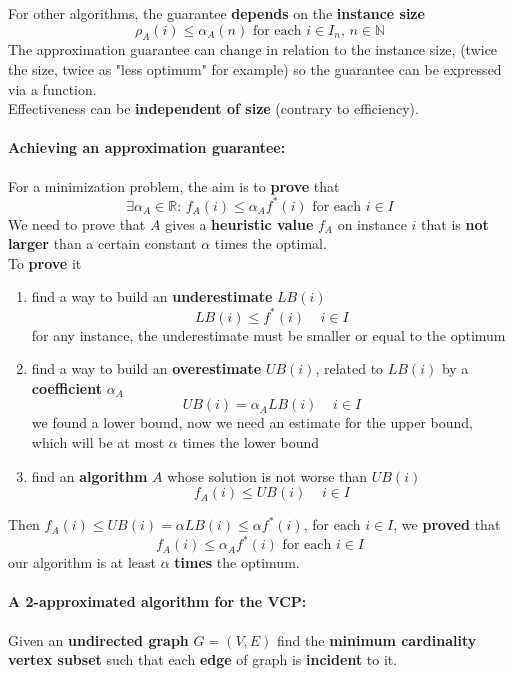 For other algorithms, the guarantee \textbf{depends} on the \textbf{instance size}
$$ \rho_A (i) \leq \alpha_A (n) \text{ for each } i \in I_n, \, n \in \mathbb{N} $$
The approximation guarantee can change in relation to the instance size, (twice the size, twice as "less optimum" for example) so the guarantee can be expressed via a function.\\

Effectiveness can be \textbf{independent of size} (contrary to efficiency).\\

\newpage

\paragraph{Achieving an approximation guarantee:} For a minimization problem, the aim is to \textbf{prove} that
$$ \exists \alpha_A \in \mathbb{R} : \, f_A (i) \leq \alpha_A f^\ast (i) \text{ for each } i \in I $$
We need to prove that $A$ gives a \textbf{heuristic value} $f_A$ on instance $i$ that is \textbf{not larger} than a certain constant $\alpha$ times the optimal.\\

To \textbf{prove} it
\begin{enumerate}
	\item find a way to build an \textbf{underestimate} $LB(i)$
	$$ LB(i) \leq f^\ast (i) \;\;\;\; i \in I $$
	for any instance, the underestimate must be smaller or equal to the optimum
	\item find a way to build an \textbf{overestimate} $UB(i)$, related to $LB(i)$ by a \textbf{coefficient} $\alpha_A$
	$$ UB(i) = \alpha_A LB(i) \;\;\;\; i \in I $$
	we found a lower bound, now we need an estimate for the upper bound, which will be at most $\alpha$ times the lower bound
	\item find an \textbf{algorithm} $A$ whose solution is not worse than $UB(i)$
	$$ f_A (i) \leq UB(i) \;\;\;\; i \in I $$
\end{enumerate}
Then $f_A (i) \leq UB(i) = \alpha LB(i) \leq \alpha f^\ast (i)$, for each $i \in I$, we \textbf{proved} that
$$ f_A (i) \leq \alpha_A f^\ast (i) \text{ for each } i \in I $$
our algorithm is at least $\alpha$ \textbf{times} the optimum.\\

\newpage

\paragraph{A 2-approximated algorithm for the VCP:} Given an \textbf{undirected graph} $G = (V , E )$ find the \textbf{minimum cardinality vertex subset} such that each \textbf{edge} of graph is \textbf{incident} to it.\\

